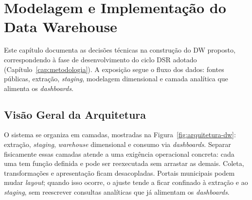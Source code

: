 \chapter{Modelagem e Implementação do Data Warehouse}
\label{cap:dw}

Este capítulo documenta as decisões técnicas na construção do DW proposto, correspondendo à fase de desenvolvimento do ciclo DSR adotado (Capítulo~\ref{cap:metodologia}). A exposição segue o fluxo dos dados: fontes públicas, extração, \textit{staging}, modelagem dimensional e camada analítica que alimenta os \textit{dashboards}.
\section{Visão Geral da Arquitetura}

O sistema se organiza em camadas, mostradas na Figura~\ref{fig:arquitetura-dw}: extração, \textit{staging}, \textit{warehouse} dimensional e consumo via \textit{dashboards}. Separar fisicamente essas camadas atende a uma exigência operacional concreta: cada uma tem função definida e pode ser reexecutada sem arrastar as demais. Coleta, transformações e apresentação ficam desacopladas. Portais municipais podem mudar \textit{layout}; quando isso ocorre, o ajuste tende a ficar confinado à extração e ao \textit{staging}, sem reescrever consultas analíticas que já alimentam os \textit{dashboards}.

